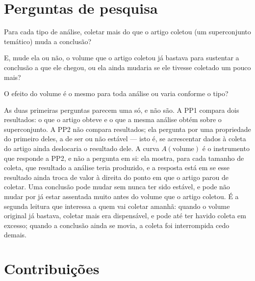 \section{Perguntas de pesquisa}

\begin{description}[leftmargin=2.2em,style=nextline]
  \item[PP1] Para cada tipo de análise, coletar mais do que o artigo coletou (um
  superconjunto temático) muda a conclusão?
  \item[PP2] E, mude ela ou não, o volume que o artigo coletou já bastava para
  sustentar a conclusão a que ele chegou, ou ela ainda mudaria se ele tivesse
  coletado um pouco mais?
  \item[PP3] O efeito do volume é o mesmo para toda análise ou varia conforme o
  tipo?
\end{description}

As duas primeiras perguntas parecem uma só, e não são. A PP1 compara dois
resultados: o que o artigo obteve e o que a mesma análise obtém sobre o
superconjunto. A PP2 não compara resultados; ela pergunta por uma propriedade do
primeiro deles, a de ser ou não estável --- isto é, se acrescentar dados à coleta do
artigo ainda deslocaria o resultado dele. A curva $A(\text{volume})$ é o instrumento
que responde a PP2, e não a pergunta em si: ela mostra, para cada tamanho de coleta,
que resultado a análise teria produzido, e a resposta está em se esse resultado ainda
troca de valor à direita do ponto em que o artigo parou de coletar. Uma conclusão
pode mudar sem nunca ter sido estável, e pode não mudar por já estar assentada muito
antes do volume que o artigo coletou. É a segunda leitura que interessa a quem vai coletar amanhã:
quando o volume original já bastava, coletar mais era dispensável, e pode até ter
havido coleta em excesso; quando a conclusão ainda se movia, a coleta foi
interrompida cedo demais.

\section{Contribuições}

